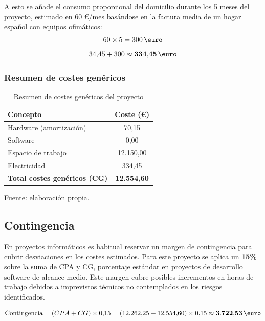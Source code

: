 \documentclass{article}
\begin{document}
    \justify
    A esto se añade el consumo proporcional del domicilio durante los 5 meses del 
    proyecto, estimado en 60 \euro/mes basándose en la factura media de un hogar 
    español con equipos ofimáticos:
    \[
    60 \times 5 = 300 \, \text{\euro}
    \]
    \[
    34{,}45 + 300 \approx \mathbf{334{,}45} \, \text{\euro}
    \]

    \subsubsection{Resumen de costes genéricos}
    \normalsize
    \setlength{\parskip}{0.6em}

    \begin{table}[H]
    \centering
    \begin{tabular}{lc}
    \hline
    \textbf{Concepto} & \textbf{Coste (\euro)} \\
    \hline
    Hardware (amortización) & 70,15 \\
    Software & 0,00 \\
    Espacio de trabajo & 12.150,00 \\
    Electricidad & 334,45 \\
    \hline
    \textbf{Total costes genéricos (CG)} & \textbf{12.554,60} \\
    \hline
    \end{tabular}
    \caption{Resumen de costes genéricos del proyecto}
    \label{tab:costes_genericos}
    \footnotesize Fuente: elaboración propia.
    \end{table}

    \subsection{Contingencia}
    \normalsize
    \setlength{\parskip}{0.6em}
    \justify
    En proyectos informáticos es habitual reservar un margen de contingencia para 
    cubrir desviaciones en los costes estimados. Para este proyecto se aplica un 
    \textbf{15\%} sobre la suma de CPA y CG, porcentaje estándar en proyectos de 
    desarrollo software de alcance medio. Este 
    margen cubre posibles incrementos en horas de trabajo debidos a imprevistos 
    técnicos no contemplados en los riesgos identificados.

    \[
    \text{Contingencia} = (CPA + CG) \times 0{,}15 = 
    (12.262{,}25 + 12.554{,}60) \times 0{,}15 \approx \mathbf{3.722{,}53} \, \text{\euro}
    \]
\end{document}
